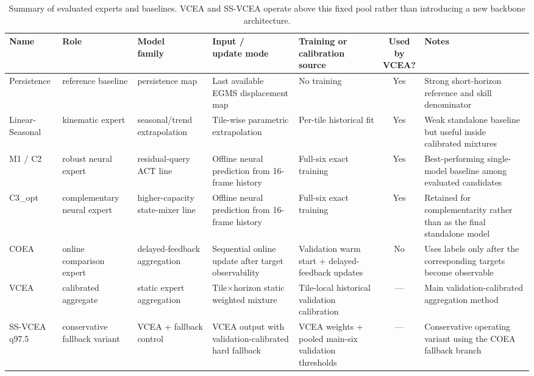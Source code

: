 \documentclass[lettersize,journal]{IEEEtran}
\begin{document}
\begin{table}[!t]
  \centering
  \caption{Summary of evaluated experts and baselines. VCEA and SS-VCEA operate above this fixed pool rather than introducing a new backbone architecture.}
  \label{tab:table04}
  \footnotesize
  \begin{adjustbox}{max width=\textwidth}
  \begin{tabular}{p{}p{}p{}p{}p{}cp{}}
    \toprule
    Name & Role & \shortstack{Model\\family} & \shortstack{Input /\\update mode} & \shortstack{Training or\\calibration source} & \shortstack{Used by\\VCEA?} & Notes \\
    \midrule
    Persistence & reference baseline & persistence map & Last available EGMS displacement map & No training & Yes & Strong short-horizon reference and skill denominator \\
    Linear-Seasonal & kinematic expert & seasonal/trend extrapolation & Tile-wise parametric extrapolation & Per-tile historical fit & Yes & Weak standalone baseline but useful inside calibrated mixtures \\
    M1 / C2 & robust neural expert & residual-query ACT line & Offline neural prediction from 16-frame history & Full-six exact training & Yes & Best-performing single-model baseline among evaluated candidates \\
    C3\_opt & complementary neural expert & higher-capacity state-mixer line & Offline neural prediction from 16-frame history & Full-six exact training & Yes & Retained for complementarity rather than as the final standalone model \\
    COEA & online comparison expert & delayed-feedback aggregation & Sequential online update after target observability & Validation warm start + delayed-feedback updates & No & Uses labels only after the corresponding targets become observable \\
    VCEA & calibrated aggregate & static expert aggregation & Tile$\times$horizon static weighted mixture & Tile-local historical validation calibration & --- & Main validation-calibrated aggregation method \\
    SS-VCEA q97.5 & conservative fallback variant & VCEA + fallback control & VCEA output with validation-calibrated hard fallback & VCEA weights + pooled main-six validation thresholds & --- & Conservative operating variant using the COEA fallback branch \\
    \bottomrule
  \end{tabular}
  \end{adjustbox}
\end{table}
\end{document}
